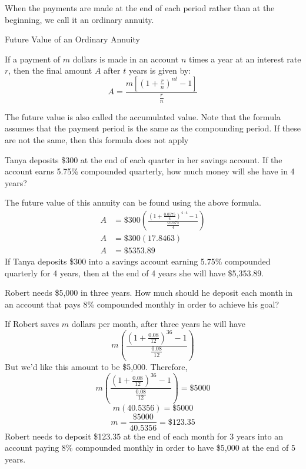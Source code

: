 When the payments are made at the end of each period rather than at the beginning, we call it an ordinary annuity.

\begin{summarybox}{Future Value of an Ordinary Annuity}

    If a payment of $m$ dollars is made in an account $n$ times a year at an interest rate $r$, then the final amount $A$ after $t$ years is given by:
    \[
        A = \frac{m \left[ \left(1 + \frac{r}{n}\right)^{nt} - 1 \right]}{\frac{r}{n}}
    \]
\end{summarybox}
The future value is also called the accumulated value. Note that the formula assumes that the payment period is the same as the compounding period.  If these are not the same, then this formula does not apply

\begin{example}
    Tanya deposits \$300 at the end of each quarter in her savings account. If the account earns 5.75\% compounded quarterly, how much money will she have in 4 years?
\end{example}

\begin{solution}
    The future value of this annuity can be found using the above formula.
    \begin{align*}
        A & = \$300\left(\frac{(1 + \frac{0.0575}{4})^{4 \cdot 4} - 1}{\frac{0.0575}{4}}\right) \\
        A & = \$300(17.8463)                                                                    \\
        A & = \$5353.89
    \end{align*}
    If Tanya deposits \$300 into a savings account earning 5.75\% compounded quarterly for 4 years, then at the end of 4 years she will have \$5,353.89.
\end{solution}

\begin{example}
    Robert needs \$5,000 in three years. How much should he deposit each month in an account that pays 8\% compounded monthly in order to achieve his goal?
\end{example}

\begin{solution}
    If Robert saves \( m \) dollars per month, after three years he will have
    \[ m\left(\frac{(1+\frac{0.08}{12})^{36}-1}{\frac{0.08}{12}}\right) \]
    But we'd like this amount to be \$5,000. Therefore,
    \[ m\left(\frac{(1+\frac{0.08}{12})^{36}-1}{\frac{0.08}{12}}\right) = \$5000 \]
    \[ m (40.5356) = \$5000 \]
    \[ m = \frac{\$5000}{40.5356} = \$123.35 \]
    Robert needs to deposit \$123.35 at the end of each month for 3 years into an account paying 8\% compounded monthly in order to have \$5,000 at the end of 5 years.
\end{solution}

